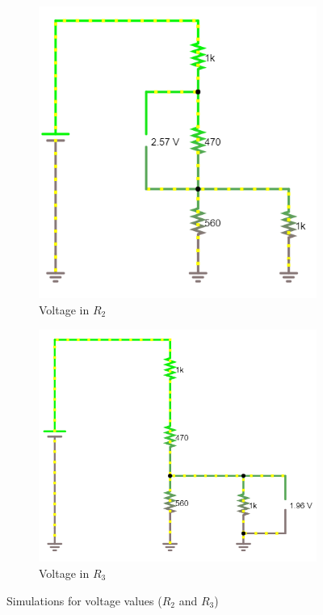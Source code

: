 \documentclass[letterpaper]{article}
\begin{document}
\begin{figure}[H]
\begin{subfigure}{0.48\textwidth}
\includegraphics[width=\linewidth]{sims/VR2}
\caption{Voltage in $R_2$}
\end{subfigure}
\begin{subfigure}{0.48\textwidth}
\includegraphics[width=\linewidth]{sims/VR3}
\caption{Voltage in $R_3$}
\end{subfigure}
    \caption{Simulations for voltage values ($R_2$ and $R_3$)}
\end{figure}
\end{document}
